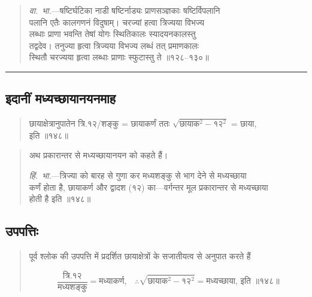 \documentclass[11pt,a4paper]{article}
\newcommand{\longline}{\noindent\rule{\textwidth}{0.4pt}}
\newcommand{\dev}[1]{{\devanagarifont #1}}
\newenvironment{shloka}{%
  \begin{quote}
  \small
  \setlength{\leftmargin}{2em}
  \devanagarifont
}{\end{quote}}
\newenvironment{vyakhya}{%
  \begin{quote}
  \small
  \setlength{\leftmargin}{1em}
  \devanagarifont
}{\end{quote}}
\newcommand{\skt}[1]{{\devanagarifont #1}}
\begin{document}
\begin{vyakhya}
\textit{वा.~भा.}—\skt{षष्टिर्घटिका नाडी षष्टिर्नाड्यः प्राणसञ्ज्ञकाः षष्टिर्विपलानि}\\
\skt{पलानि एतैः कालगणनं विदुषाम्। चरज्यां हत्वा त्रिज्यया विभज्य}\\
\skt{लब्धाः प्राणा भवन्ति तेषां योगः स्थितिकालः स्यादयनकालस्तु}\\
\skt{तद्वदेव। तनुज्या हृत्वा त्रिज्यया विभज्य लब्धं तत् प्रमाणकालः}\\
\skt{स्थितौ चरज्यया हृत्वा लब्धाः प्राणाः स्फुटास्तु ते ॥१२८--१३०॥}
\end{vyakhya}

\longline

\subsection{\dev{इदानीं मध्यच्छायानयनमाह}}

\begin{shloka}
\skt{छायाक्षेत्रानुपातेन त्रि.१२/शङ्कु = छायाकर्णं ततः $\sqrt{\text{छायाक}^2 - १२^2}$ = छाया,}\\
\skt{इति ॥१४८॥}
\end{shloka}

\begin{vyakhya}
\skt{अथ प्रकारान्तर से मध्यच्छायानयन को कहते हैं।}

\textit{हिं.\ भा.}—\skt{त्रिज्या को बारह से गुणा कर मध्यशङ्कु से भाग देने से मध्यच्छाया}\\
\skt{कर्णं होता है, छायाकर्ण और द्वादश (१२) का—वर्गन्तर मूल प्रकारान्तर से मध्यच्छाया}\\
\skt{होती है इति ॥१४८॥}
\end{vyakhya}

\subsection{\dev{उपपत्तिः}}

\begin{vyakhya}
\skt{पूर्व श्लोक की उपपत्ति में प्रदर्शित छायाक्षेत्रों के सजातीयत्व से अनुपात करते हैं}

\begin{equation*}
\frac{\text{त्रि.} १२}{\text{मध्यशङ्कु}} = \text{मध्याकर्ण,} \quad \therefore \sqrt{\text{छायाक}^2 - १२^2} = \text{मध्यच्छाया, इति ॥१४८॥}
\end{equation*}
\end{vyakhya}
\end{document}
